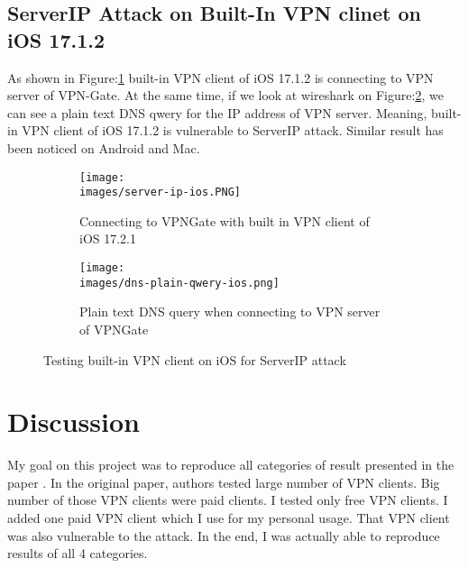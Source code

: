 \documentclass[letterpaper,11pt]{article}
\newcommand{\images}{images}
\newcommand{\fig}{Figure:}
\begin{document}
\subsection{ServerIP Attack on Built-In VPN clinet on iOS 17.1.2}
As shown in \fig \ref{fig:server-ip-ios} built-in VPN client of iOS 17.1.2 is connecting to VPN server of VPN-Gate.
At the same time, if we look at wireshark on \fig \ref{fig:server-ip-ios-res}, we can see a plain text DNS qwery for the IP address of VPN server.
Meaning, built-in VPN client of iOS 17.1.2 is vulnerable to ServerIP attack. Similar result has been noticed on Android and Mac.
\begin{figure*}[h]
	\centering
	\begin{subfigure}{0.20\textwidth}
		\centering
		\texttt{[image: \\images/server-ip-ios.PNG]}
		\caption{Connecting to VPNGate with built in VPN client of iOS 17.2.1}
		\label{fig:server-ip-ios}
	\end{subfigure}
	\begin{subfigure}{0.75\textwidth}
		\centering
		\texttt{[image: \\images/dns-plain-qwery-ios.png]}
		\caption{Plain text DNS query when connecting to VPN server of VPNGate}
		\label{fig:server-ip-ios-res}
	\end{subfigure}
	\caption{Testing built-in VPN client on iOS for ServerIP attack}
	\label{fig:server-ip}
\end{figure*}

\section{Discussion}
My goal on this project was to reproduce all categories of result presented in the paper \cite{vpnleaks}.
In the original paper, authors tested large number of VPN clients. Big number of those VPN clients were paid clients.
I tested only free VPN clients. I added one paid VPN client which I use for my personal usage.
That VPN client was also vulnerable to the attack.
In the end, I was actually able to reproduce results of all 4 categories.

 

\end{document}
